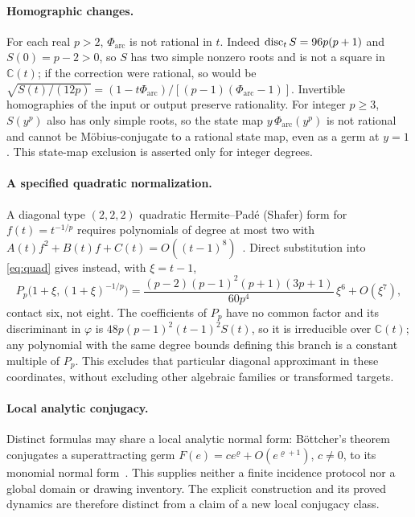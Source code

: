 \paragraph{Homographic changes.}
For each real $p>2$, $\Phi_{\mathrm{arc}}$ is not rational in $t$. Indeed $\operatorname{disc}_tS=96p(p+1)$ and
$S(0)=p-2>0$, so $S$ has two simple nonzero roots and is not a square in $\mathbb{C}(t)$; if the
correction were rational, so would be
$\sqrt{S(t)/(12p)}=(1-t\Phi_{\mathrm{arc}})/[(p-1)(\Phi_{\mathrm{arc}}-1)]$. Invertible homographies of
the input or output preserve rationality. For integer $p\ge3$, $S(y^{p})$ also has only simple roots,
so the state map $y\,\Phi_{\mathrm{arc}}(y^{p})$ is not rational and cannot be M\"obius-conjugate to a
rational state map, even as a germ at $y=1$. This state-map exclusion is asserted only for integer
degrees.

\paragraph{A specified quadratic normalization.}
A diagonal type $(2,2,2)$ quadratic Hermite--Pad\'e (Shafer) form for $f(t)=t^{-1/p}$ requires
polynomials of degree at most two with $A(t)f^{2}+B(t)f+C(t)=O((t-1)^{8})$~\cite[eqs.~(1.4)--(1.6)]{cabay}.
Direct substitution into \eqref{eq:quad} gives instead, with $\xi=t-1$,
\[ P_p\bigl(1+\xi,(1+\xi)^{-1/p}\bigr)=\frac{(p-2)(p-1)^{2}(p+1)(3p+1)}{60p^{4}}\,\xi^{6}+O(\xi^{7}), \]
contact six, not eight. The coefficients of $P_p$ have no common factor and its discriminant in
$\varphi$ is $48p(p-1)^{2}(t-1)^{2}S(t)$, so it is irreducible over $\mathbb{C}(t)$; any polynomial
with the same degree bounds defining this branch is a constant multiple of $P_p$. This excludes that
particular diagonal approximant in these coordinates, without excluding other algebraic families or
transformed targets.

\paragraph{Local analytic conjugacy.}
Distinct formulas may share a local analytic normal form: B\"ottcher's theorem conjugates a
superattracting germ $F(e)=ce^{\varrho}+O(e^{\varrho+1})$, $c\neq0$, to its monomial normal form~\cite{buff}. This
supplies neither a finite incidence protocol nor a global domain or drawing inventory. The explicit
construction and its proved dynamics are therefore distinct from a claim of a new local conjugacy class.

